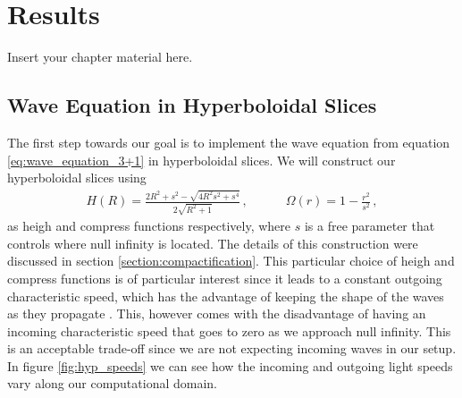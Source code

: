 
\chapter{Results}
\label{chapter:results}

Insert your chapter material here.


\section{Wave Equation in Hyperboloidal Slices}
\label{section:hyp_wave}

The first step towards our goal is to implement the wave equation from equation \eqref{eq:wave_equation_3+1} in hyperboloidal slices. We will construct our hyperboloidal slices using 
%
\begin{align}
    H(R) = \frac{2 R^2 + s^2 - \sqrt{4 R^2 s^2 + s^4}}{2 \sqrt{R^2 + 1}} \,, \quad \quad \quad \Omega(r) = 1 - \frac{r^2}{s^2} \,,
\end{align}
%
as heigh and compress functions respectively, where $s$ is a free parameter that controls where null infinity is located. The details of this construction were discussed in section \ref{section:compactification}. This particular choice of heigh and compress functions is of particular interest since it leads to a constant outgoing characteristic speed, which has the advantage of keeping the shape of the waves as they propagate \cite{Hyperboloidal_layers_for_hyperbolic_equations_on_unbounded_domains,The_evolution_of_hyperboloidal_data_with_the_dual_foliation_formalism_Mathematical_analysis_and_wave_equation_tests}. This, however comes with the disadvantage of having an incoming characteristic speed that goes to zero as we approach null infinity. This is an acceptable trade-off since we are not expecting incoming waves in our setup. In figure \ref{fig:hyp_speeds} we can see how the incoming and outgoing light speeds vary along our computational domain.

